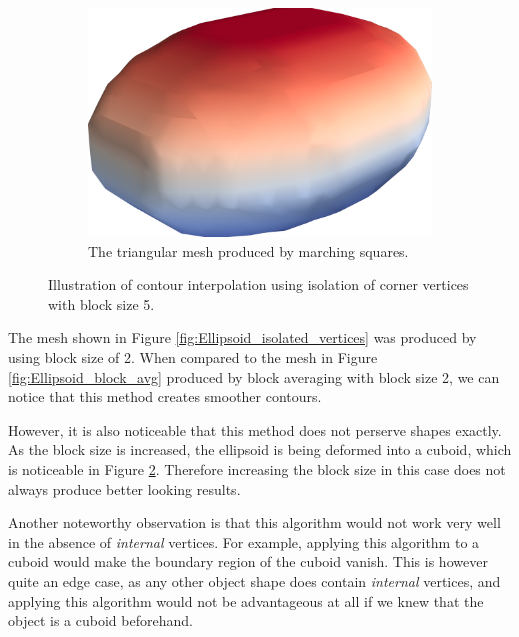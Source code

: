 \documentclass[a4paper,10pt]{report}
\begin{document}
\begin{figure}[H]
    \hfill
    \begin{subfigure}{.32\textwidth}
        \includegraphics[width=\textwidth]{../images/3D/Ellipsoid_marching_squares_isolated_vertices_5.png}
    \caption{The triangular mesh produced by marching squares.}
    \label{fig:Ellipsoid_marching_squares_isolated_vertices_5}
    \end{subfigure}
    \caption{Illustration of contour interpolation using isolation of corner vertices with block size 5.}
    \label{fig:Ellipsoid_isolated_vertices_5}
\end{figure}

The mesh shown in Figure \ref{fig:Ellipsoid_isolated_vertices} was produced by using block size of 2. When compared to the mesh in Figure \ref{fig:Ellipsoid_block_avg} produced by block averaging with block size 2, we can notice that this method creates smoother contours.

However, it is also noticeable that this method does not perserve shapes exactly. As the block size is increased, the ellipsoid is being deformed into a cuboid, which is noticeable in Figure \ref{fig:Ellipsoid_isolated_vertices_5}. Therefore increasing the block size in this case does not always produce better looking results.

Another noteworthy observation is that this algorithm would not work very well in the absence of \textit{internal} vertices. For example, applying this algorithm to a cuboid would make the boundary region of the cuboid vanish. This is however quite an edge case, as any other object shape does contain \textit{internal} vertices, and applying this algorithm would not be advantageous at all if we knew that the object is a cuboid beforehand.
\end{document}
